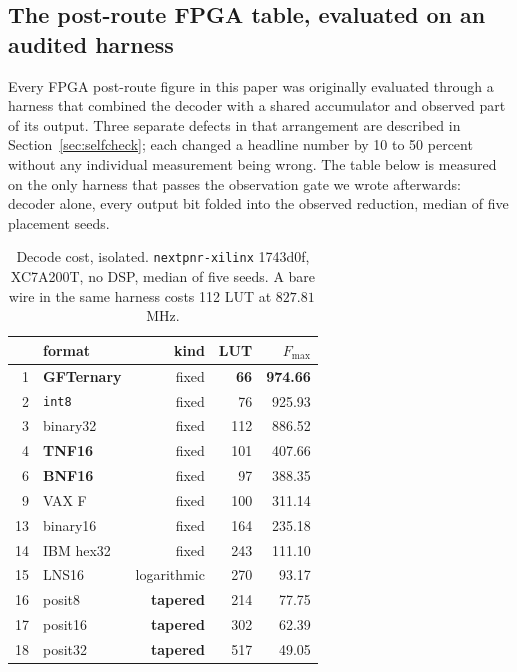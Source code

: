\subsection{The post-route FPGA table, evaluated on an audited harness}\label{sec:cleantable}


Every FPGA post-route figure in this paper was originally evaluated through a
harness that
combined the decoder with a shared accumulator and observed part of its output.
Three separate defects in that arrangement are described in
Section~\ref{sec:selfcheck}; each changed a headline number by 10 to 50 percent
without any individual measurement being wrong. The table below is measured on
the only harness that passes the observation gate we wrote afterwards: decoder
alone, every output bit folded into the observed reduction, median of five
placement seeds.

\begin{table}[t]\centering
\caption{Decode cost, isolated. \texttt{nextpnr-xilinx} 1743d0f, XC7A200T, no
DSP, median of five seeds. A bare wire in the same harness costs 112 LUT at
$827.81$\,MHz.}
\label{tab:cleandecode}
\small
\begin{tabular}{rlrrr}
\toprule
& format & kind & LUT & $F_{\max}$ \\
\midrule
1 & \textbf{GFTernary} & fixed & \textbf{66} & \textbf{974.66} \\
2 & \texttt{int8} & fixed & 76 & 925.93 \\
3 & binary32 & fixed & 112 & 886.52 \\
4 & \textbf{TNF16} & fixed & 101 & 407.66 \\
6 & \textbf{BNF16} & fixed & 97 & 388.35 \\
9 & VAX F & fixed & 100 & 311.14 \\
13 & binary16 & fixed & 164 & 235.18 \\
14 & IBM hex32 & fixed & 243 & 111.10 \\
15 & LNS16 & logarithmic & 270 & 93.17 \\
16 & posit8 & \textbf{tapered} & 214 & 77.75 \\
17 & posit16 & \textbf{tapered} & 302 & 62.39 \\
18 & posit32 & \textbf{tapered} & 517 & 49.05 \\
\bottomrule
\end{tabular}
\end{table}

